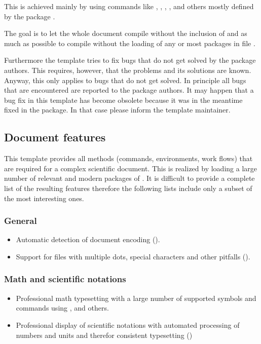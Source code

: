 This is achieved mainly by using commands like , , , ,  and others mostly defined by the package . 

The goal is to let the whole document compile without the inclusion of  and as much as possible to compile without the loading of any or most packages in file .

Furthermore the template tries to fix bugs that do not get solved by the package authors. This requires, however, that the problems and its solutions are known. Anyway, this only applies to bugs that do not get solved. In principle all bugs that are encountered are reported to the package authors.
It may happen that a bug fix in this template has become obsolete because it was in the meantime fixed in the package. In that case please inform the template maintainer.

\subsection{Document features}
\label{sec:doc:features:doc}
This template provides all methods (commands, environments, work flows) that are required for a complex scientific document. This is realized by loading a large number of relevant and modern packages of \latex. It is difficult to provide a complete list of the resulting features therefore the following lists include only a subset of the most interesting ones.

\subsubsection*{General}
\begin{itemize}
\item Automatic detection of document encoding ().
\item Support for files with multiple dots, special characters and other pitfalls ().
\end{itemize}

\subsubsection*{Math and scientific notations}
\begin{itemize}
\item Professional math typesetting with a large number of supported symbols and commands using ,  and others.
%
\item Professional display of scientific notations with automated processing of numbers and units and therefor consistent typesetting ()
%
\end{itemize}

